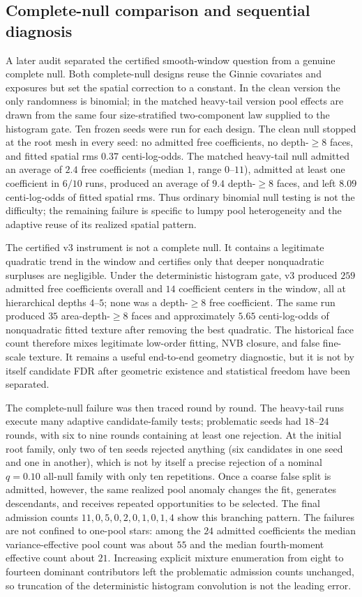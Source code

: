 \documentclass[11pt]{article}
\begin{document}
\subsection*{Complete-null comparison and sequential diagnosis}
A later audit separated the certified smooth-window question from a genuine complete null.  Both
complete-null designs reuse the Ginnie covariates and exposures but set the spatial correction to a
constant.  In the clean version the only randomness is binomial; in the matched heavy-tail version
pool effects are drawn from the same four size-stratified two-component law supplied to the
histogram gate.  Ten frozen seeds were run for each design.  The clean null stopped at the root mesh
in every seed: no admitted free coefficients, no depth-$\geq 8$ faces, and fitted spatial rms
$0.37$ centi-log-odds.  The matched heavy-tail null admitted an average of $2.4$ free coefficients
(median $1$, range $0$--$11$), admitted at least one coefficient in $6/10$ runs, produced an average
of $9.4$ depth-$\geq8$ faces, and left $8.09$ centi-log-odds of fitted spatial rms.  Thus ordinary
binomial null testing is not the difficulty; the remaining failure is specific to lumpy pool
heterogeneity and the adaptive reuse of its realized spatial pattern.

The certified v3 instrument is not a complete null.  It contains a legitimate quadratic trend in the
window and certifies only that deeper nonquadratic surpluses are negligible.  Under the deterministic
histogram gate, v3 produced $259$ admitted free coefficients overall and $14$ coefficient centers in
the window, all at hierarchical depths $4$--$5$; none was a depth-$\geq8$ free coefficient.  The
same run produced $35$ area-depth-$\geq8$ faces and approximately $5.65$ centi-log-odds of
nonquadratic fitted texture after removing the best quadratic.  The historical face count therefore
mixes legitimate low-order fitting, NVB closure, and false fine-scale texture.  It remains a useful
end-to-end geometry diagnostic, but it is not by itself candidate FDR after geometric existence and
statistical freedom have been separated.

The complete-null failure was then traced round by round.  The heavy-tail runs execute many adaptive
candidate-family tests; problematic seeds had $18$--$24$ rounds, with six to nine rounds containing
at least one rejection.  At the initial root family, only two of ten seeds rejected anything (six
candidates in one seed and one in another), which is not by itself a precise rejection of a nominal
$q=0.10$ all-null family with only ten repetitions.  Once a coarse false split is admitted, however,
the same realized pool anomaly changes the fit, generates descendants, and receives repeated
opportunities to be selected.  The final admission counts $11,0,5,0,2,0,1,0,1,4$ show this branching
pattern.  The failures are not confined to one-pool stars: among the $24$ admitted coefficients the
median variance-effective pool count was about $55$ and the median fourth-moment effective count
about $21$.  Increasing explicit mixture enumeration from eight to fourteen dominant contributors
left the problematic admission counts unchanged, so truncation of the deterministic histogram
convolution is not the leading error.
\end{document}
